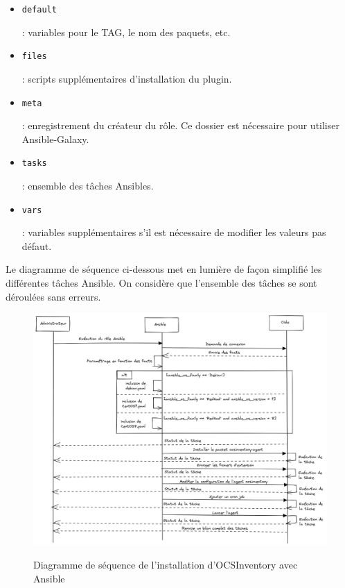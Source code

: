 \documentclass[12pt, a4paper, twoside]{article}
\begin{document}
\begin{itemize}
    \item \begin{code}\texttt{default}\end{code}: variables pour le TAG, le nom des paquets, etc.
    \item \begin{code}\texttt{files}\end{code}: scripts supplémentaires d'installation du plugin.
    \item \begin{code}\texttt{meta}\end{code}: enregistrement du créateur du rôle. Ce dossier est nécessaire pour utiliser \gls{Ansible}-Galaxy.
    \item \begin{code}\texttt{tasks}\end{code}: ensemble des tâches Ansibles.
    \item \begin{code}\texttt{vars}\end{code}: variables supplémentaires s'il est nécessaire de modifier les valeurs pas défaut.
\end{itemize}

\newpage
Le diagramme de séquence ci-dessous met en lumière de façon simplifié les différentes tâches \gls{Ansible}. 
On considère que l'ensemble des tâches se sont déroulées sans erreurs.

\begin{figure}[!ht]
    \centering
    \includegraphics[width=\textwidth]{src/graph_ansible_ocs.png}
    \label{fig:ansible_ocs}
    \caption{Diagramme de séquence de l'installation d'\gls{OCSInventory} avec \gls{Ansible}}
\end{figure}
\end{document}
